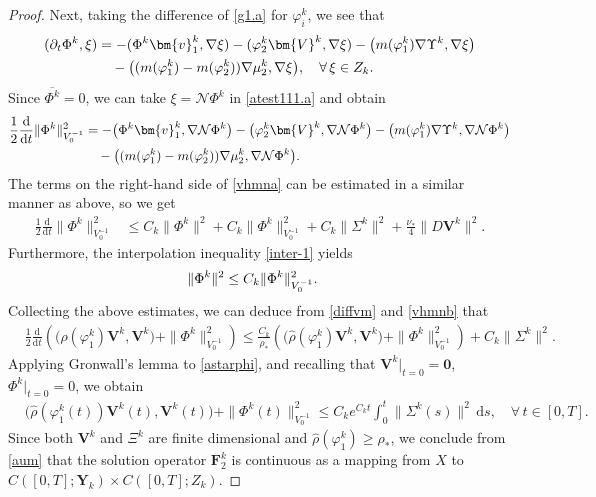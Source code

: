 \documentclass[11pt,reqno]{amsart}
\begin{document}
\begin{proof}
Next, taking the difference of \eqref{g1.a} for $\varphi^k_i$, we see that
%
\begin{align}
(\partial_t  \Phi^{k},\xi)
&= -(\Phi^{k}\bm{v}^{k}_{1},\nabla \xi)
- (\varphi^{k}_{2}\bm{V}^{k},\nabla \xi)
- \big(m(\varphi^k_1)\nabla \Upsilon^{k},\nabla \xi\big)
\notag \\
&\quad - \big((m(\varphi^k_1)-m(\varphi^k_2))\nabla \mu^{k}_2,\nabla \xi\big),
\quad \forall\, \xi\in  Z_{k}.
\label{atest111.a}
\end{align}
%
Since $\overline{\Phi^k}=0$, we can take $\xi=\mathcal{N} \Phi^{k}$ in \eqref{atest111.a} and obtain
%
\begin{align}
\frac{1}{2}\frac{\mathrm{d}}{\mathrm{d}t} \|\Phi^{k} \|_{V_0^{-1}}^2
&= -\big(\Phi^{k}\bm{v}^{k}_{1},\nabla \mathcal{N} \Phi^{k} \big)
- \big(\varphi^{k}_{2}\bm{V}^{k},\nabla\mathcal{N} \Phi^{k} \big)
- \big(m(\varphi^k_1)\nabla \Upsilon^{k},\nabla \mathcal{N} \Phi^{k} \big)
\notag \\
&\quad
- \big((m(\varphi^k_1)-m(\varphi^k_2))\nabla \mu^{k}_2,\nabla \mathcal{N} \Phi^{k} \big).
\label{vhmna}
\end{align}
%
The terms on the right-hand side of \eqref{vhmna} can be estimated in a similar manner as above, so we get
%
\begin{align}
\frac{1}{2}\frac{\mathrm{d}}{\mathrm{d}t} \|\Phi^{k} \|_{V_0^{-1}}^2
&\leq C_k \|\Phi^{k}\|^2
+ C_k \|\Phi^{k}\|_{V_0^{-1}}^2
+ C_k \|\Sigma^k\|^2
+ \frac{\nu_*}{4}\|D\bm{V}^{k}\|^2.
\label{vhmnb}
\end{align}
%
Furthermore, the interpolation inequality \eqref{inter-1} yields
%
\begin{align}
\|\Phi^k\|^2
&\leq C_k  \|\Phi^{k} \|_{V_0^{-1}}^2.
\notag
\end{align}
%
Collecting the above estimates, we can deduce from \eqref{diffvm} and \eqref{vhmnb} that
%
\begin{align}
& \frac{1}{2}\frac{\mathrm{d}}{\mathrm{d}t}
\left(\big(\widehat{\rho}(\varphi_1^k)\bm{V}^k,\bm{V}^k\big)
+ \|\Phi^{k} \|_{V_0^{-1}}^2 \right)
\le \frac{C_k}{\rho_*}\left(\big(\widehat{\rho}(\varphi_1^k)\bm{V}^k,\bm{V}^k\big)
+ \|\Phi^{k} \|_{V_0^{-1}}^2 \right)
+ C_k \|\Sigma^k\|^2.
\label{astarphi}
\end{align}
%
Applying Gronwall's lemma to \eqref{astarphi}, and recalling that  $\bm{V}^k|_{t=0}=\bm{0}$, $\Phi^k|_{t=0}=0$, we obtain
%
\begin{align}
&\big(\widehat{\rho}(\varphi_1^k(t))\bm{V}^k(t),\bm{V}^k(t)\big)
+ \|\Phi^{k}(t) \|_{V_0^{-1}}^2
 \le  C_k e^{C_k t} \int_0^t\| \Sigma^k(s)\|^2\,\mathrm{d}s,
 \quad \forall\, t\in [0,T].
\label{aum}
\end{align}
%
Since both $\bm{V}^k$ and $\Xi^k$ are finite dimensional and $\widehat{\rho}(\varphi_1^k)\geq \rho_*$, we conclude from \eqref{aum} that the solution operator $\mathbf{F}^k_2$ is continuous as a mapping from $X$ to $C([0,T];\bm{Y}_{k})\times C([0,T];Z_{k})$.
\medskip


\end{proof}
\end{document}
